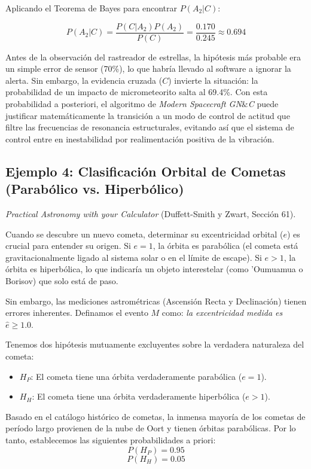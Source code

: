 Aplicando el Teorema de Bayes para encontrar $P(A_2 | C)$:

$$ P(A_2 | C) = \frac{P(C | A_2) P(A_2)}{P(C)} = \frac{0.170}{0.245} \approx 0.694 $$

Antes de la observación del rastreador de estrellas, la hipótesis más probable era un simple error de sensor (70\%), lo que habría llevado al software a ignorar la alerta. Sin embargo, la evidencia cruzada ($C$) invierte la situación: la probabilidad de un impacto de micrometeorito salta al 69.4\%. Con esta probabilidad a posteriori, el algoritmo de \textit{Modern Spacecraft GN$\&$C} puede justificar matemáticamente la transición a un modo de control de actitud que filtre las frecuencias de resonancia estructurales, evitando así que el sistema de control entre en inestabilidad por realimentación positiva de la vibración.

\subsection{Ejemplo 4: Clasificación Orbital de Cometas (Parabólico vs. Hiperbólico)}

\textit{Practical Astronomy with your Calculator} (Duffett-Smith y Zwart, Sección 61). 

Cuando se descubre un nuevo cometa, determinar su excentricidad orbital ($e$) es crucial para entender su origen. Si $e = 1$, la órbita es parabólica (el cometa está gravitacionalmente ligado al sistema solar o en el límite de escape). Si $e > 1$, la órbita es hiperbólica, lo que indicaría un objeto interestelar (como 'Oumuamua o Borisov) que solo está de paso.

Sin embargo, las mediciones astrométricas (Ascensión Recta y Declinación) tienen errores inherentes. Definamos el evento $M$ como: \textit{la excentricidad medida es } $\hat{e} \ge 1.0$. 

Tenemos dos hipótesis mutuamente excluyentes sobre la verdadera naturaleza del cometa:
\begin{itemize}
    \item $H_P$: El cometa tiene una órbita verdaderamente parabólica ($e = 1$).
    \item $H_H$: El cometa tiene una órbita verdaderamente hiperbólica ($e > 1$).
\end{itemize}

Basado en el catálogo histórico de cometas, la inmensa mayoría de los cometas de período largo provienen de la nube de Oort y tienen órbitas parabólicas. Por lo tanto, establecemos las siguientes probabilidades a priori:
$$ P(H_P) = 0.95 $$
$$ P(H_H) = 0.05 $$

